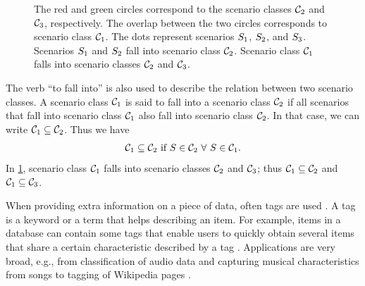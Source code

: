 \setlength{\venncircle}{7em}
\begin{figure}
	\centering
	
	\caption{\cbstartc The red and green circles correspond to the scenario classes $\mathcal{C}_{2}$ and $\mathcal{C}_{3}$, respectively. The overlap between the two circles corresponds to scenario class $\mathcal{C}_{1}$. The dots represent scenarios $S_{1}$, $S_{2}$, and $S_{3}$. Scenarios $S_{1}$ and $S_{2}$ fall into scenario class $\mathcal{C}_{2}$. Scenario class $\mathcal{C}_{1}$ falls into scenario classes $\mathcal{C}_{2}$ and $\mathcal{C}_{3}$.\cbend}
	\label{fig:venn diagram scenario class}
\end{figure}

The verb ``to fall into'' is also used to describe the relation between two scenario classes. A scenario class $\mathcal{C}_{1}$ is said to fall into a scenario class $\mathcal{C}_{2}$ if all scenarios that fall into scenario class $\mathcal{C}_{1}$ also fall into scenario class $\mathcal{C}_{2}$. In that case, we can write $\mathcal{C}_{1} \subseteq \mathcal{C}_{2}$. Thus we have
\begin{equation} \label{eq:fall into scenario class}
	\mathcal{C}_{1} \subseteq \mathcal{C}_{2} \text{ if } S \in \mathcal{C}_{2} \,\,\forall\,\, S \in \mathcal{C}_{1}.
\end{equation}
\cbstartc
In \cref{fig:venn diagram scenario class}, scenario class $\mathcal{C}_{1}$ falls into scenario classes $\mathcal{C}_{2}$ and $\mathcal{C}_{3}$; thus $\mathcal{C}_{1} \subseteq \mathcal{C}_{2}$ and $\mathcal{C}_{1} \subseteq \mathcal{C}_{3}$.
\cbend

When providing extra information on a piece of data, often tags are used \cite{smith2007tagging}. A tag is a keyword or a term that helps describing an item. For example, items in a database can contain some tags that enable users to quickly obtain several items that share a certain characteristic described by a tag \cite{craft2004tagging, vasquez2019controlling}. Applications are very broad, e.g., from classification of audio data \cite{kong2017joint} and capturing musical characteristics from songs \cite{ellis2011semantic} to tagging of Wikipedia pages \cite{voss2006collaborative}.


